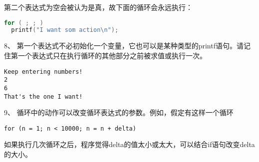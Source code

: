 \begin{frame}[fragile]
第二个表达式为空会被认为是真，故下面的循环会永远执行：
\begin{lstlisting}[language=c,backgroundcolor=\color{red!10}]
for ( ; ; )
  printf("I want som action\n");
\end{lstlisting}

\end{frame}

\begin{frame}[fragile]
8、 第一个表达式不必初始化一个变量，它也可以是某种类型的printf语句。请记住第一个表达式只在执行循环的其他部分之前被求值或执行一次。
\end{frame}

\begin{frame}[fragile]
  
\end{frame}

\begin{frame}[fragile]
\begin{lstlisting}[backgroundcolor=\color{red!10}]
Keep entering numbers!
2
6
That's the one I want!
\end{lstlisting}
\end{frame}

\begin{frame}[fragile]
9、 循环中的动作可以改变循环表达式的参数。例如，假定有这样一个循环
\begin{lstlisting}
for (n = 1; n < 10000; n = n + delta)
\end{lstlisting}
如果执行几次循环之后，程序觉得delta的值太小或太大，可以结合if语句改变delta的大小。
\end{frame}


